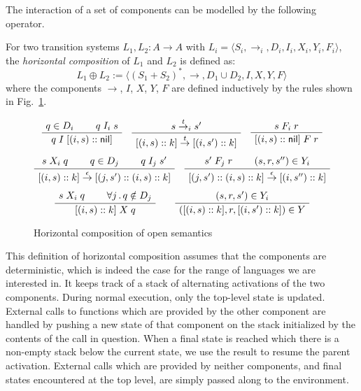\documentclass[sigplan,10pt,review,anonymous]{acmart}\settopmatter{printfolios=true,printccs=false,printacmref=false}
\newcommand{\kw}[1]{\ensuremath{ \mathsf{#1} }}
\begin{document}
The interaction of a set of components
can be modelled by the following operator.

\begin{definition} \label{def:hcomp} %
For two transition systems $L_1, L_2 : A \rightarrow A$
with
$L_i = \langle S_i, {\rightarrow}_i, D_i, I_i, X_i, Y_i, F_i \rangle$,
the \emph{horizontal composition} of $L_1$ and $L_2$
is defined as:
\[
    L_1 \oplus L_2 :=
    \langle
      (S_1 + S_2)^*, {\rightarrow}, D_1 \cup D_2, I, X, Y, F
    \rangle
\]
where the components $\rightarrow$, $I$, $X$, $Y$, $F$
are defined inductively by
the rules shown in Fig.~\ref{fig:hcomp}.
\end{definition}

\begin{figure} %
    \footnotesize
    \begin{gather*}
        \AxiomC{$q \in D_i$}
        \AxiomC{$q \mathrel{I_i} s$}
        \BinaryInfC{$q \mathrel{I} [(i, s) :: \kw{nil}]$}
        \DisplayProof
        \quad
        \AxiomC{$s \stackrel{t}{\rightarrow}_i s'$}
        \UnaryInfC{$
            [(i, s) :: k]
            \stackrel{t}{\rightarrow}
            [(i, s') :: k]$}
        \DisplayProof
        \quad
        \AxiomC{$s \mathrel{F_i} r$}
        \UnaryInfC{$[(i, s) :: \kw{nil}] \mathrel{F} r$}
        \DisplayProof
        \\[1ex]
        \AxiomC{$s \mathrel{X_i} q$}
        \AxiomC{$q \in D_j$}
        \AxiomC{$q \mathrel{I_j} s'$}
        \TrinaryInfC{$
            [(i, s) :: k]
            \stackrel{\epsilon}{\rightarrow}
            [(j, s') :: (i, s) :: k]$}
        \DisplayProof
        \quad
        \AxiomC{$s' \mathrel{F_j} r$}
        \AxiomC{$(s, r, s'') \in Y_i$}
        \BinaryInfC{$
            [(j, s') :: (i, s) :: k]
            \stackrel{\epsilon}{\rightarrow}
            [(i, s'') :: k]$}
        \DisplayProof
        \\[1ex]
        \AxiomC{$s \mathrel{X_i} q$}
        \AxiomC{$\forall j \,.\, q \notin D_j$}
        \BinaryInfC{$[(i, s) :: k] \mathrel{X} q$}
        \DisplayProof
        \qquad
        \AxiomC{$(s, r, s') \in Y_i$}
        \UnaryInfC{$([(i, s) :: k], r, [(i, s') :: k]) \in Y$}
        \DisplayProof
    \end{gather*}
    \caption{Horizontal composition of open semantics}
    \label{fig:hcomp}
\end{figure}

This definition of horizontal composition
assumes that the components are deterministic,
which is indeed the case for the range of languages
we are interested in.
It keeps track of a stack of alternating activations
of the two components.
During normal execution,
only the top-level state is updated.
External calls to functions which are provided by the other component
are handled by pushing a new state of that component on the stack
initialized by the contents of the call in question.
When a final state is reached
which there is a non-empty stack below the current state,
we use the result to resume the parent activation.
External calls which are provided by neither components,
and final states encountered at the top level,
are simply passed along to the environment.
\end{document}
